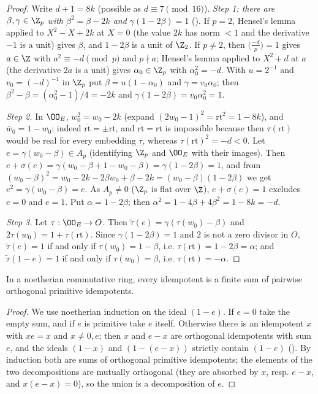 \begin{proof}
Write $d+1=8k$ (possible as $d\equiv7\pmod{16}$). \emph{Step 1: there are $\beta,\gamma\in\Z_p$ with
$\beta^2=\beta-2k$ and $\gamma(1-2\beta)=1$} (). If $p=2$,
Hensel's lemma applied to $X^2-X+2k$ at $X=0$ (the value $2k$ has norm $<1$ and the derivative $-1$ is a unit)
gives $\beta$, and $1-2\beta$ is a unit of $\Z_2$. If $p\ne2$, then $\bigl(\frac{-d}p\bigr)=1$ gives $a\in\Z$ with
$a^2\equiv-d\pmod p$ and $p\nmid a$; Hensel's lemma applied to $X^2+d$ at $a$ (the derivative $2a$ is a unit) gives
$\alpha_0\in\Z_p$ with $\alpha_0^2=-d$. With $u=2^{-1}$ and $v_0=(-d)^{-1}$ in $\Z_p$ put $\beta=u(1-\alpha_0)$ and
$\gamma=v_0\alpha_0$; then $\beta^2-\beta=(\alpha_0^2-1)/4=-2k$ and $\gamma(1-2\beta)=v_0\alpha_0^2=1$.

\emph{Step 2.} In $\OO_E$, $w_0^2=w_0-2k$ (expand $(2w_0-1)^2=\mathrm{rt}^2=1-8k$), and $\bar w_0=1-w_0$: indeed
$\overline{\mathrm{rt}}=\pm\mathrm{rt}$, and $\overline{\mathrm{rt}}=\mathrm{rt}$ is impossible because then
$\tau(\mathrm{rt})$ would be real for every embedding $\tau$, whereas $\tau(\mathrm{rt})^2=-d<0$. Let
$e=\gamma(w_0-\beta)\in A_p$ (identifying $\Z_p$ and $\OO_E$ with their images). Then
$e+\sigma(e)=\gamma(w_0-\beta+1-w_0-\beta)=\gamma(1-2\beta)=1$, and from
$(w_0-\beta)^2=w_0-2k-2\beta w_0+\beta-2k=(w_0-\beta)(1-2\beta)$ we get $e^2=\gamma(w_0-\beta)=e$. As $A_p\ne0$
($\Z_p$ is flat over $\Z$), $e+\sigma(e)=1$ excludes $e=0$ and $e=1$. Put $\alpha=1-2\beta$; then
$\alpha^2=1-4\beta+4\beta^2=1-8k=-d$.

\emph{Step 3.} Let $\tau:\OO_E\to O$. Then $\tilde\tau(e)=\gamma(\tau(w_0)-\beta)$ and $2\tau(w_0)=1+\tau(\mathrm{rt})$.
Since $\gamma(1-2\beta)=1$ and $2$ is not a zero divisor in $O$, $\tilde\tau(e)=1$ if and only if
$\tau(w_0)=1-\beta$, i.e. $\tau(\mathrm{rt})=1-2\beta=\alpha$; and $\tilde\tau(1-e)=1$ if and only if
$\tau(w_0)=\beta$, i.e. $\tau(\mathrm{rt})=-\alpha$.
\end{proof}

\begin{lemma}\label{pf:sh-local:primdec}
In a noetherian commutative ring, every idempotent is a finite sum of pairwise orthogonal primitive idempotents.
\end{lemma}

\begin{proof}
We use noetherian induction on the ideal $(1-e)$. If $e=0$ take the empty sum, and if $e$ is primitive take $e$
itself. Otherwise there is an idempotent $x$ with $xe=x$ and $x\ne0,e$; then $x$ and $e-x$ are orthogonal
idempotents with sum $e$, and the ideals $(1-x)$ and $(1-(e-x))$ strictly contain $(1-e)$
(). By induction both are sums of orthogonal primitive idempotents; the elements of
the two decompositions are mutually orthogonal (they are absorbed by $x$, resp. $e-x$, and $x(e-x)=0$), so the
union is a decomposition of $e$.
\end{proof}

